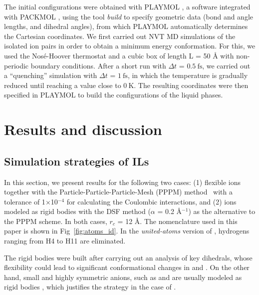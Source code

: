 \documentclass[3p,twocolumn]{elsarticle}
\begin{document}
The initial configurations were obtained with PLAYMOL \cite{playmol}, a software integrated with PACKMOL \cite{Mart_nez_2009}, using the tool \textit{build} to specify geometric data (bond and angle lengths, and dihedral angles), from which PLAYMOL automatically determines the Cartesian coordinates.
We first carried out NVT MD simulations of the isolated ion pairs in order to obtain a minimum energy conformation.
For this, we used the Nos\'{e}-Hoover thermostat \cite{Martyna1992} and a cubic box of length L = 50 {\AA} with non-periodic boundary conditions.
After a short run with $\Delta t$ = $0.5~\text{fs}$, we carried out a ``quenching'' simulation with $\Delta t$ = $1 ~\text{fs}$, in which the temperature is gradually reduced until reaching a value close to $0~\text{K}$.
The resulting coordinates were then specified in PLAYMOL \cite{playmol} to build the configurations of the liquid phases.

\section{Results and discussion}
\label{sec:results}

\subsection{Simulation strategies of ILs}
\label{sec:prel_results}

In this section, we present results for the following two cases: (1) flexible ions together with the Particle-Particle-Particle-Mesh (PPPM) method~\cite{Hockney_1988} with a tolerance of 1$\times$10$^{-4}$ for calculating the Coulombic interactions, and (2) ions modeled as rigid bodies with the DSF method \cite{Fennell2006} ($\alpha$ = 0.2 {\AA}$^{-1}$) as the alternative to the PPPM scheme.
In both cases, $r_c$ = 12 {\AA}.
The nomenclature used in this paper is shown in Fig~\ref{fig:atoms_id}.
In the \textit{united-atoms} version of \ce{[emim]^+}, hydrogens ranging from H4 to H11 are eliminated.

The rigid bodies were built after carrying out an analysis of key dihedrals, whose flexibility could lead to significant conformational changes in \ce{[emim]^+} and \ce{[NTf_2]^-}.
On the other hand, small and highly symmetric anions, such as  and  are usually modeled as rigid bodies \cite{HANKE_2001,Hanke_2003,Lynden_Bell_2006}, which justifies the strategy in the case of \ce{[B(CN)_4]^-}.
\end{document}
